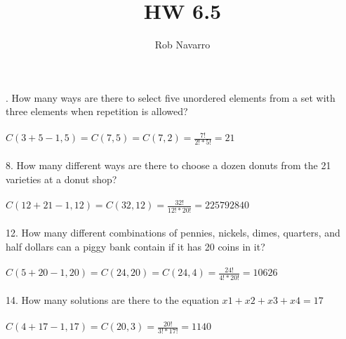 \documentclass[11pt, oneside]{article}   	%
\title{HW 6.5}
\author{Rob Navarro}
\begin{document}
\maketitle

. How many ways are there to select five unordered elements from a set with three elements when repetition is allowed?\\\\
$C(3 + 5 - 1, 5) = C(7,5) = C(7,2) = \frac{7!}{2! * 5!} = 21$\\\\
8. How many different ways are there to choose a dozen donuts from the 21 varieties at a donut shop?\\\\
$C(12 + 21 - 1, 12) = C(32,12) = \frac{32!}{12! * 20!} = 225792840$\\\\
12. How many different combinations of pennies, nickels, dimes, quarters, and half dollars can a piggy bank contain if it has 20 coins in it?\\\\
$C(5 + 20 - 1, 20) = C(24, 20) = C(24,4) = \frac{24!}{4! * 20!} = 10626$\\\\
14. How many solutions are there to the equation $x1 + x2 + x3 + x4 = 17$\\\\
$C(4 + 17 - 1, 17) = C(20,3) = \frac{20!}{3! * 17!} = 1140$
\end{document}
